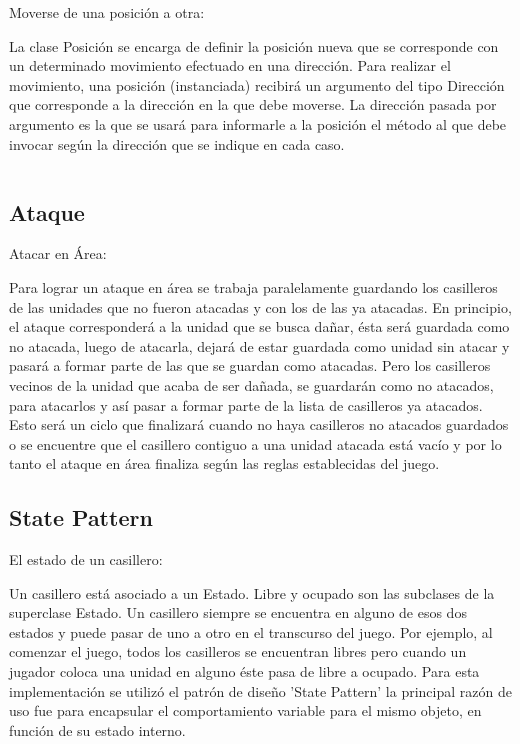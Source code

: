 \documentclass[titlepage,a4paper]{article}
\begin{document}
Moverse de una posición a otra:  

La clase Posición se encarga de definir la posición nueva que se corresponde con un determinado movimiento efectuado en una dirección. Para realizar el movimiento, una posición (instanciada) recibirá un argumento del tipo Dirección que corresponde a la dirección en la que debe moverse. 
La dirección pasada por argumento es la que se usará para informarle a la posición el método al que debe invocar según la dirección que se indique en cada caso. 

\begin{verbatim}

\end{verbatim}

\subsection{Ataque}
Atacar en Área:  

Para lograr un ataque en área se trabaja paralelamente guardando los casilleros de las unidades que no fueron atacadas y con los de las ya atacadas. En principio, el ataque corresponderá a la unidad que se busca dañar, ésta será guardada como no atacada, luego de atacarla, dejará de estar guardada como unidad sin atacar y pasará a formar parte de las que se guardan como atacadas. Pero los casilleros vecinos de la unidad que acaba de ser dañada, se guardarán como no atacados, para atacarlos y así pasar a formar parte de la lista de casilleros ya atacados. Esto será un ciclo que finalizará cuando no haya casilleros no atacados guardados o se encuentre que el casillero contiguo a una unidad atacada está vacío y por lo tanto el ataque en área finaliza según las reglas establecidas del juego. 

\subsection{State Pattern}

El estado de un casillero:

Un casillero está asociado a un Estado. Libre y ocupado son las subclases de la superclase Estado. Un casillero siempre se encuentra en alguno de esos dos estados y puede pasar de uno a otro en el transcurso del juego.
Por ejemplo, al comenzar el juego, todos los casilleros se encuentran libres pero cuando un jugador coloca una unidad en alguno éste pasa de libre a ocupado. Para esta implementación se utilizó el patrón de diseño 'State Pattern' la principal razón de uso fue para encapsular el comportamiento variable para el mismo objeto, en función de su estado interno. 
\end{document}
